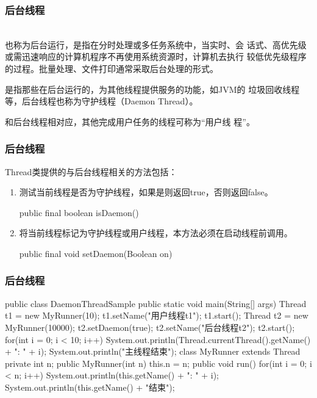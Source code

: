 \begin{frame}[fragile] %
\frametitle{后台线程}

\\
 也称为后台运行，是指在分时处理或多任务系统中，当实时、会
话式、高优先级或需迅速响应的计算机程序不再使用系统资源时，计算机去执行
较低优先级程序的过程。批量处理、文件打印通常采取后台处理的形式。\pause

 是指那些在后台运行的，为其他线程提供服务的功能，如JVM的
垃圾回收线程等，后台线程也称为守护线程（Daemon Thread）。\pause

 和后台线程相对应，其他完成用户任务的线程可称为“用户线
程”。
\end{frame}

\begin{frame}[fragile] %
\frametitle{后台线程}
Thread类提供的与后台线程相关的方法包括：

\begin{enumerate}\kai
\item 测试当前线程是否为守护线程，如果是则返回true，否则返回false。
\begin{javaCode}
public final boolean isDaemon()
\end{javaCode}
\item 将当前线程标记为守护线程或用户线程，本方法必须在启动线程前调用。
\begin{javaCode}
public final void setDaemon(Boolean on)
\end{javaCode}
\end{enumerate}
\end{frame}

\begin{frame}[fragile] %
\frametitle{后台线程}


\begin{javaCode}
public class DaemonThreadSample {
  public static void main(String[] args) {
    Thread t1 = new MyRunner(10);
    t1.setName("用户线程t1");
    t1.start();
    Thread t2 = new MyRunner(10000);
    t2.setDaemon(true);
    t2.setName("后台线程t2");
    t2.start();
    for(int i = 0; i < 10; i++) {
      System.out.println(Thread.currentThread().getName() + ": " + i);
    }
    System.out.println("主线程结束");
  }
}
class MyRunner extends Thread {
  private int n;
  public MyRunner(int n) {
    this.n = n;
  }
  public void run() {
    for(int i = 0; i < n; i++) {
      System.out.println(this.getName() + ": " + i);
    }
    System.out.println(this.getName() + "结束");
  }
}  
\end{javaCode}
\end{frame}

